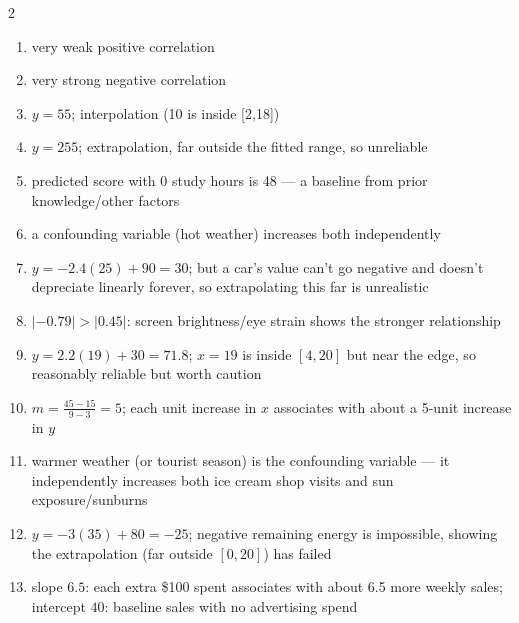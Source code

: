 \documentclass[11pt]{article}
\begin{document}
\begin{keybox}
\begin{multicols}{2}
\small
\begin{enumerate}[leftmargin=*,itemsep=3pt]
  \item very weak positive correlation
  \item very strong negative correlation
  \item $y=55$; interpolation (10 is inside [2,18])
  \item $y=255$; extrapolation, far outside the fitted range, so unreliable
  \item predicted score with 0 study hours is 48 --- a baseline from prior knowledge/other factors
  \item a confounding variable (hot weather) increases both independently
  \item $y=-2.4(25)+90=30$; but a car's value can't go negative and doesn't depreciate linearly forever, so extrapolating this far is unrealistic
  \item $|-0.79|>|0.45|$: screen brightness/eye strain shows the stronger relationship
  \item $y=2.2(19)+30=71.8$; $x=19$ is inside $[4,20]$ but near the edge, so reasonably reliable but worth caution
  \item $m=\tfrac{45-15}{9-3}=5$; each unit increase in $x$ associates with about a 5-unit increase in $y$
  \item warmer weather (or tourist season) is the confounding variable --- it independently increases both ice cream shop visits and sun exposure/sunburns
  \item $y=-3(35)+80=-25$; negative remaining energy is impossible, showing the extrapolation (far outside $[0,20]$) has failed
  \item slope $6.5$: each extra \$100 spent associates with about 6.5 more weekly sales; intercept $40$: baseline sales with no advertising spend
\end{enumerate}
\end{multicols}
\end{keybox}
\end{document}
